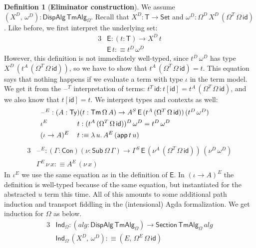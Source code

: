 \documentclass[12pt,a4paper,twoside,openany]{book}
\theoremstyle{remark}
\theoremstyle{definition}
\newtheorem{mydefinition}{Definition}
\theoremstyle{theorem}
\newcommand{\mi}[1]{\mathit{#1}}
\newcommand{\ms}[1]{\mathsf{#1}}
\newcommand{\id}{\mathsf{id}}
\newcommand{\Con}{\mathsf{Con}}
\newcommand{\Sub}{\mathsf{Sub}}
\newcommand{\Tm}{\mathsf{Tm}}
\newcommand{\Ty}{\mathsf{Ty}}
\newcommand{\blank}{\mathord{\hspace{1pt}\text{--}\hspace{1pt}}}
\newcommand{\Set}{\mathsf{Set}}
\newcommand{\app}{\ms{app}}
\newcommand{\DispAlg}{\ms{DispAlg}}
\newcommand{\Section}{\ms{Section}}
\newcommand{\TmAlg}{\ms{TmAlg}}
\newcommand{\Ind}{\ms{Ind}}
\newcommand{\defn}{:\equiv}
\begin{document}
\begin{mydefinition}[\textbf{Eliminator construction}]\label{def:simple-eliminator-construction}
We assume $(X^D,\,\omega^D) : \DispAlg\,\TmAlg_\Omega$. Recall that $X^D :
\ms{T} \to \Set$ and $\omega^D : \Omega^D\,X^D\,(\Omega^T\,\Omega\,\id)$. Like
before, we first interpret the underlying set:
\begin{alignat*}{3}
  & \ms{E} : (t : \ms{T}) \to X^D\,t \\
  & \ms{E}\,t \defn t^D\,\omega^D
\end{alignat*}
However, this definition is not immediately well-typed, since $t^D\,\omega^D$
has type $X^D\,(t^A\,(\Omega^T\,\Omega\,\id))$, so we have to show that
$t^A\,(\Omega^T\,\Omega\,\id) = t$. This equation says that nothing happens if
we evaluate a term with type $\iota$ in the term model. We get it from the
$\blank^T$ interpretation of terms: $t^T\,\id : t[\id] =
t^A\,(\Omega^T\,\Omega\,\id)$, and we also know that $t[\id] = t$. We interpret types
and contexts as well:
\begin{alignat*}{3}
  & \hspace{-6em}\rlap{$\blank^E : (A : \Ty)(t : \Tm\,\Omega\,A) \to A^S\,\ms{E}\,(t^A\,(\Omega^T\,\Omega\,\id))\,(t^D\,\omega^D)$}\\
  & \hspace{-6em}\iota^E\,&&t : (t^A\,(\Omega^T\,\Omega\,\id))^D\,\omega^D = t^D\,\omega^D\\
  & \hspace{-6em}(\iota\to A)^E\,&&t \defn \lambda\,u.\, A^E\,(\app\,t\,u)
\end{alignat*}
\begin{alignat*}{3}
  & \blank^E : (\Gamma : \Con)(\nu : \Sub\,\Omega\,\Gamma) \to \Gamma^S\,\ms{E}\,(\nu^A\,(\Omega^T\,\Omega\,\id))\, (\nu^D\,\omega^D)\\
  & \Gamma^E\,\nu\,x \defn A^E\,(\nu\,x)
\end{alignat*}
In $\iota^E$ we use the same equation as in the definition of $\ms{E}$. In
$(\iota\to A)^E$ the definition is well-typed because of the same equation, but
instantiated for the abstracted $u$ term this time. All of this amounts to some
additional path induction and transport fiddling in the (intensional) Agda
formalization. We get induction for $\Omega$ as below.
\begin{alignat*}{3}
  &\Ind_{\Omega} : (\mi{alg} : \DispAlg\,\TmAlg_\Omega) \to \Section\,\TmAlg_\Omega\,\mi{alg}\\
  &\Ind_{\Omega}\,(X^D,\,\omega^D) \defn (E,\, \Omega^E\,\Omega\,\id)
\end{alignat*}
\end{mydefinition}
\end{document}
